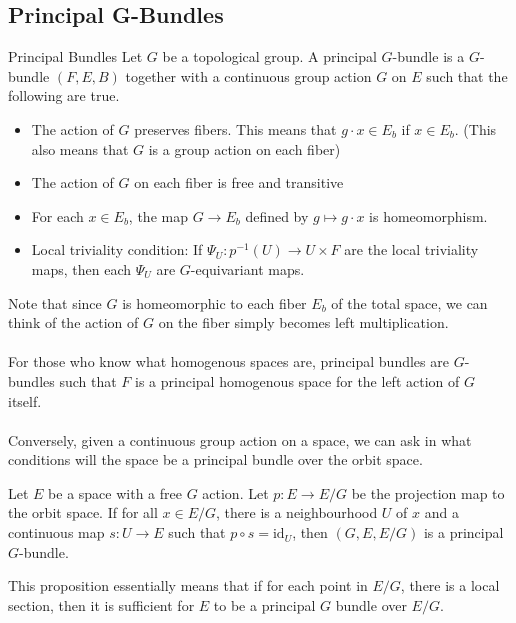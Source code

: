 \documentclass[a4paper]{article}
\begin{document}
\subsection{Principal G-Bundles}
\begin{defn}{Principal Bundles}{} Let $G$ be a topological group. A principal $G$-bundle is a $G$-bundle $(F,E,B)$ together with a continuous group action $G$ on $E$ such that the following are true. 
\begin{itemize}
\item The action of $G$ preserves fibers. This means that $g\cdot x\in E_b$ if $x\in E_b$. (This also means that $G$ is a group action on each fiber)
\item The action of $G$ on each fiber is free and transitive
\item For each $x\in E_b$, the map $G\to E_b$ defined by $g\mapsto g\cdot x$ is homeomorphism. 
\item Local triviality condition: If $\Psi_U:p^{-1}(U)\to U\times F$ are the local triviality maps, then each $\Psi_U$ are $G$-equivariant maps. 
\end{itemize}
\end{defn}

Note that since $G$ is homeomorphic to each fiber $E_b$ of the total space, we can think of the action of $G$ on the fiber simply becomes left  multiplication. \\~\\

For those who know what homogenous spaces are, principal bundles are $G$-bundles such that $F$ is a principal homogenous space for the left action of $G$ itself. \\~\\

Conversely, given a continuous group action on a space, we can ask in what conditions will the space be a principal bundle over the orbit space. 

\begin{prp}{}{} Let $E$ be a space with a free $G$ action. Let $p:E\to E/G$ be the projection map to the orbit space. If for all $x\in E/G$, there is a neighbourhood $U$ of $x$ and a continuous map $s:U\to E$ such that $p\circ s=\text{id}_U$, then $(G,E,E/G)$ is a principal $G$-bundle. 
\end{prp}

This proposition essentially means that if for each point in $E/G$, there is a local section, then it is sufficient for $E$ to be a principal $G$ bundle over $E/G$. 
\end{document}
